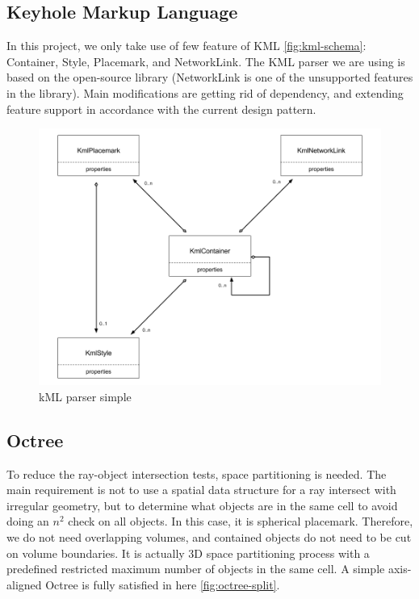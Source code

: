 \subsection{Keyhole Markup Language}
\label{section:kml}

In this project, we only take use of few feature of KML \ref{fig:kml-schema}: Container, Style, Placemark,  and NetworkLink. The KML parser we are using is based on the open-source library  \parencite{Google.code-kml.2016} (NetworkLink is one of the unsupported features in the library). Main modifications are getting rid of  dependency, and extending  feature support in accordance with the current design pattern.

\begin{figure}[H]
\caption[kml-parser-simple]{kML parser simple}
\label{fig:kml-parser-simple}
\centering
\includegraphics[width=\linewidth]{Figures/kml-parser-simple.png}
\decoRule
\end{figure}

\subsection{Octree} 
\label{section:octree}

To reduce the ray-object intersection tests,  space partitioning is needed. The main requirement is not to use a spatial data structure for a ray intersect with irregular geometry, but to determine what objects are in the same cell to avoid doing an $n^2$ check on all objects. In this case, it is spherical placemark. Therefore, we do not need overlapping volumes, and contained objects do not need to be cut on volume boundaries. It is actually 3D space partitioning process with a predefined restricted maximum number of objects in the same cell. A simple axis-aligned Octree is fully satisfied in here \ref{fig:octree-split}.

